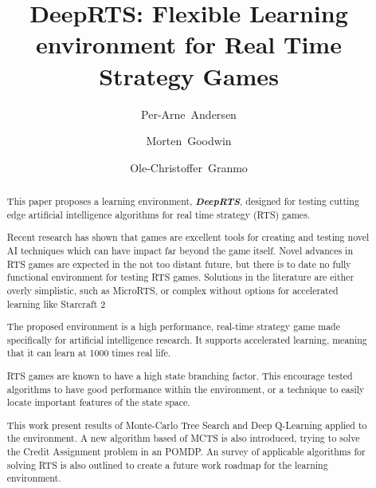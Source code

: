 \documentclass[fleqn,10pt]{article} %
\title{DeepRTS: Flexible Learning environment for Real Time Strategy Games}
\date{}
\author{Per-Arne~Andersen \and Morten~Goodwin \and Ole-Christoffer~Granmo}
\begin{document}
\flushbottom %
\maketitle %
\begin{abstract}
This paper proposes a learning environment, \textit{\textbf{DeepRTS}}, designed for testing cutting edge artificial intelligence algorithms for real time strategy (RTS) games.

Recent research has shown that games are excellent tools for creating and testing novel AI techniques which can have impact far beyond the game itself. Novel advances in RTS games are expected in the not too distant future, but there is to date no fully functional environment for testing RTS games. Solutions in the literature are either overly simplistic, such as MicroRTS, or complex without options for accelerated learning like Starcraft 2

The proposed environment is a high performance, real-time strategy game made specifically for artificial intelligence research. It supports accelerated learning, meaning that it can learn at 1000 times real life. 

RTS games are known to have a high state branching factor. This encourage tested algorithms to have good performance within the environment, or a technique to easily locate important features of the state space. 


This work present results of Monte-Carlo Tree Search and Deep Q-Learning applied to the environment. A new algorithm based of MCTS is also introduced, trying to solve the Credit Assignment problem in an POMDP.
An survey of applicable algorithms for solving RTS is also outlined to create a future work roadmap for the learning environment.
\end{abstract}

\newpage

\tableofcontents %

\thispagestyle{empty} %
\newpage
\end{document}
